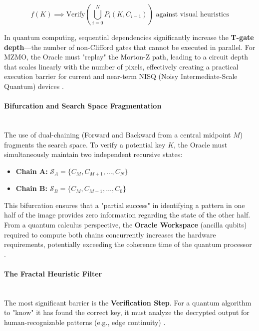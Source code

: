 \documentclass[12pt,fleqn]{article}
\begin{document}
\begin{equation}
f(K) \implies \text{Verify} \left( \bigcup_{i=0}^{N} P_i(K, C_{i-1}) \right) \text{ against visual heuristics}
\end{equation}

In quantum computing, sequential dependencies significantly increase the \textbf{T-gate depth}—the number of non-Clifford gates that cannot be executed in parallel. For MZMO, the Oracle must "replay" the Morton-Z path, leading to a circuit depth that scales linearly with the number of pixels, effectively creating a practical execution barrier for current and near-term NISQ (Noisy Intermediate-Scale Quantum) devices \cite{preskill2018quantum}.

\paragraph{Bifurcation and Search Space Fragmentation} ~\\

The use of dual-chaining (Forward and Backward from a central midpoint $M$) fragments the search space. To verify a potential key $K$, the Oracle must simultaneously maintain two independent recursive states:
\begin{itemize}
    \item \textbf{Chain A:} $\mathcal{S}_A = \{C_M, C_{M+1}, \dots, C_{N}\}$
    \item \textbf{Chain B:} $\mathcal{S}_B = \{C_M, C_{M-1}, \dots, C_{0}\}$
\end{itemize}

This bifurcation ensures that a "partial success" in identifying a pattern in one half of the image provides zero information regarding the state of the other half. From a quantum calculus perspective, the \textbf{Oracle Workspace} (ancilla qubits) required to compute both chains concurrently increases the hardware requirements, potentially exceeding the coherence time of the quantum processor \cite{gidney2021factor}.

\paragraph{The Fractal Heuristic Filter} ~\\

The most significant barrier is the \textbf{Verification Step}. For a quantum algorithm to "know" it has found the correct key, it must analyze the decrypted output for human-recognizable patterns (e.g., edge continuity) \cite{shannon1949communication}. 
\end{document}
